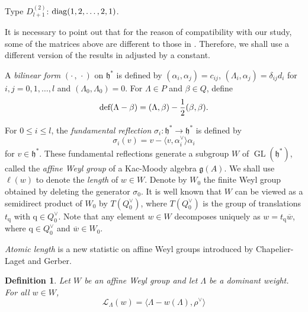 \documentclass[11pt]{amsart}
\theoremstyle{plain}
\numberwithin{equation}{subsection}
\newtheorem{definition}[theorem]{Definition}
\begin{document}
\smallskip

Type $D_{l+1}^{(2)}$: ${\rm diag}(1, 2, \dots , 2, 1)$.

\smallskip

It is necessary to point out that for the reason of compatibility with our study, some of the matrices above are different to those in \cite{HLQ}.
Therefore, we shall use a different version of the results in \cite{HLQ} adjusted by a constant.

A {\em bilinear form} $(\cdot\, , \,\cdot)$ on $\mathfrak{h}^*$ is defined by  
$(\alpha_i, \alpha_j)=c_{ij}$, $(\Lambda_i, \alpha_j)=\delta_{ij}d_i$ for $i, j=0, 1, \dots, l$ and $(\Lambda_0, \Lambda_0)=0$.
For $\Lambda\in P$ and $\beta\in Q$, define 
$$\rm def (\Lambda-\beta)=(\Lambda, \beta)-\frac{1}{2}(\beta, \beta).$$ 

For $0 \leq i \leq l$, the {\em fundamental reflection} $\sigma_i: \mathfrak{h}^*\rightarrow \mathfrak{h}^*$ is defined by 
$$\sigma_i(v)=v-\langle v,\alpha_i^{\vee}\rangle\alpha_i$$ for $v\in \mathfrak{h}^*$. These fundamental reflections 
generate a subgroup $W$ of $\operatorname{GL}(\mathfrak{h}^*)$,
called the {\em affine Weyl group} of a Kac-Moody algebra $\mathfrak{g}(A)$. We shall use $\ell(w)$ to denote the {\em length} of $w\in W$. 
Denote by $W_0$ the finite Weyl group obtained by deleting the generator $\sigma_0$.
It is well known that $W$ can be viewed as a semidirect product of $W_0$ by $T(Q_0^\vee)$, 
where $T(Q_0^\vee)$ is the group of translations $t_{\mathrm q}$ with ${\mathrm q}\in Q_0^\vee$.
Note that any element $w\in W$ decomposes uniquely as $w=t_{\mathrm q}\overline{w}$, 
where ${\mathrm q}\in Q_0^\vee$ and $\overline{w}\in W_0$.

\smallskip

{\em Atomic length} is a new statistic on affine Weyl groups introduced by Chapelier-Laget and Gerber.
\begin{definition}\cite[Definition 4.5]{CG}\label{2.1}
Let $W$ be an affine Weyl group and let $\Lambda$ be a dominant weight. For all $w\in W$,
$$\mathscr{L}_{\Lambda}(w)=\langle\Lambda-w(\Lambda),\rho^{\vee}\rangle$$
\end{definition}

\smallskip

\end{document}
